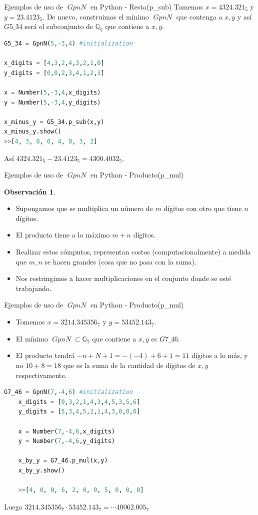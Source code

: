 \documentclass{beamer}
\theoremstyle{definition}
\numberwithin{equation}{section}
\newcommand{\redd}[1]{\textcolor{rkColor}{#1}}
\newtheorem{rr}{\redd{Observación}}
\newcommand{\Q}{\mathbb{Q}}
\DeclareMathOperator{\gpn}{\mathit{{GpnN}}}
\begin{document}
\begin{frame}[fragile]{Ejemplos de uso de $\gpn$ en Python - Resta(p\_sub) }
Tomemos ${x =4324.321_5}$ y ${y=23.4123_5}$. De nuevo, construimos el mínimo $\gpn$ que contenga a $x,y$ y así  $\mathit{G5\_{3}4}$ será el subconjunto de $\Q_5$ que contiene a $x,y$.
\begin{lstlisting}[language = Python, caption = resta de números en $\mathit{G5\_34}$,basicstyle=\tiny]
G5_34 = GpnN(5,-3,4) #initialization

x_digits = [4,3,2,4,3,2,1,0]
y_digits = [0,0,2,3,4,1,2,3]

x = Number(5,-3,4,x_digits)
y = Number(5,-3,4,y_digits)

x_minus_y = G5_34.p_sub(x,y)
x_minus_y.show()
>>[4, 3, 0, 0, 4, 0, 3, 2]

\end{lstlisting}
Así $ 4324.321_5-23.4123_5=4300.4032_5$.
\end{frame}


\begin{frame}[fragile]{Ejemplos de uso de $\gpn$ en Python - Producto(p\_mul) }
	\begin{rr}
	\label{producto}  
	\begin{itemize}
		\item  Supongamos que se multiplica un número de $m$  dígitos con otro que tiene $n$  dígitos.
		\item El producto tiene a lo máximo $m+n$ dígitos.
		\item Realizar estos cómputos, representan costos   (computacionalmente) a medida que $m,n$ se hacen grandes   (cosa que no pasa con la suma).
		\item Nos restringimos a hacer multiplicaciones en el conjunto donde se esté trabajando.
	\end{itemize}	
	\end{rr}
\end{frame}


\begin{frame}[fragile]{Ejemplos de uso de $\gpn$ en Python - Producto(p\_mul) }
	\begin{itemize}
		\item Tomemos $x=3214.345356_7$ y $y = 53452.143_7$.
		\item El mínimo $\gpn\subset\Q_7$ que contiene a $x,y$ es $\mathit{G7\_{4}6}$.
		\item El producto tendrá $-n+N+1=-   (-4)+6+1=11$ dígitos a lo más, y no $10+8=18$ que es la suma de la cantidad de dígitos de $x,y$ respectivamente.
	\end{itemize}
	\begin{lstlisting}[language = Python, caption = producto de números en $\mathit{G7\_46}$,basicstyle=\tiny]
	G7_46 = GpnN(7,-4,6) #initialization
	x_digits = [0,3,2,1,4,3,4,5,3,5,6]
	y_digits = [5,3,4,5,2,1,4,3,0,0,0]
	
	x = Number(7,-4,6,x_digits)
	y = Number(7,-4,6,y_digits)
	
	x_by_y = G7_46.p_mul(x,y)
	x_by_y.show()
	
	>>[4, 0, 0, 6, 2, 0, 0, 5, 0, 0, 0]
	\end{lstlisting}
	Luego $3214.345356_7\cdot 53452.143_7=\cdots40062.005_7$
\end{frame}
\end{document}
